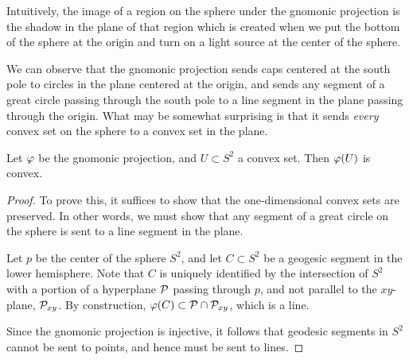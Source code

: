 Intuitively, the image of a region on the sphere under the gnomonic
projection is the shadow in the plane of that region which is
created when we put the bottom of the sphere at the origin and turn
on a light source at the center of the sphere.


We can observe that the gnomonic projection sends caps centered at the
south pole to circles in the plane centered at the origin, and sends
any segment of a great circle passing through the south pole to a line
segment in the plane passing through the origin.  What may be somewhat
surprising is that it sends \textit{every} convex set on the sphere to
a convex set in the plane.

\begin{lemma} \label{lem:gnomonic_convex}
  Let $\varphi$ be the gnomonic projection, and $U\subset S^2$ a convex 
  set. Then $\varphi(U)$ is convex.
\end{lemma}
\begin{proof}
  To prove this, it suffices to show that the one-dimensional convex
  sets are preserved. In other words, we must show that any segment of 
  a great circle on the sphere is sent to a line segment in the plane.

  Let $p$ be the center of the sphere $S^2$, and let $C\subset S^2$ be
  a geogesic segment in the lower hemisphere.  Note that $C$ is uniquely
  identified by the intersection of $S^2$ with a portion of a hyperplane
  $\mathcal{P}$ passing through $p$, and not parallel to the $xy$-plane,
  $\mathcal{P}_{xy}$. By construction, $\varphi(C)\subset \mathcal{P}\cap
  \mathcal{P}_{xy}$, which is a line. 

  Since the gnomonic projection is injective, it follows that 
  geodesic segments in $S^2$ cannot be sent to points, and hence 
  must be sent to lines.

\end{proof}

